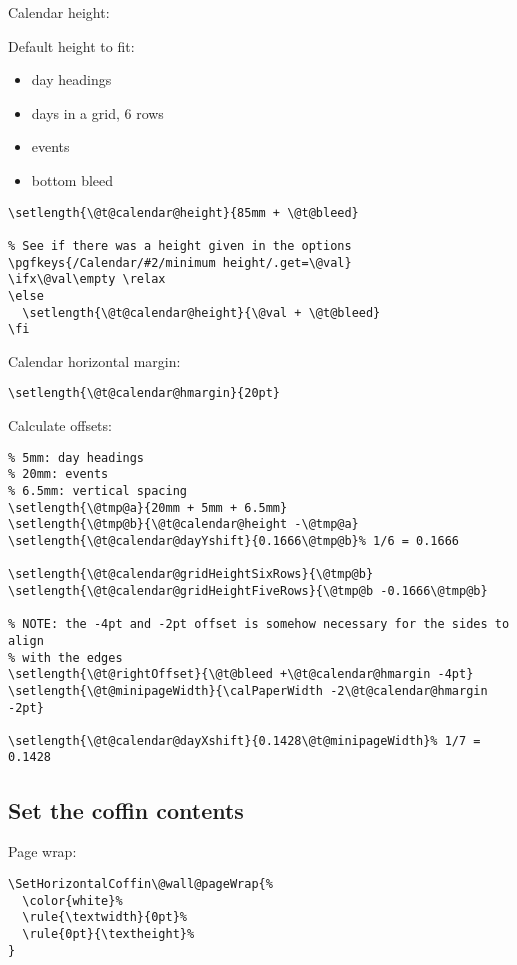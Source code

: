 \documentclass[11pt,oneside]{memoir-article}
\begin{document}
Calendar height:

Default height to fit:

\begin{itemize}
\item day headings
\item days in a grid, 6 rows
\item events
\item bottom bleed
\end{itemize}

\begin{verbatim}
\setlength{\@t@calendar@height}{85mm + \@t@bleed}

% See if there was a height given in the options
\pgfkeys{/Calendar/#2/minimum height/.get=\@val}
\ifx\@val\empty \relax
\else
  \setlength{\@t@calendar@height}{\@val + \@t@bleed}
\fi
\end{verbatim}

Calendar horizontal margin:

\begin{verbatim}
\setlength{\@t@calendar@hmargin}{20pt}
\end{verbatim}

Calculate offsets:

\begin{verbatim}
% 5mm: day headings
% 20mm: events
% 6.5mm: vertical spacing
\setlength{\@tmp@a}{20mm + 5mm + 6.5mm}
\setlength{\@tmp@b}{\@t@calendar@height -\@tmp@a}
\setlength{\@t@calendar@dayYshift}{0.1666\@tmp@b}% 1/6 = 0.1666

\setlength{\@t@calendar@gridHeightSixRows}{\@tmp@b}
\setlength{\@t@calendar@gridHeightFiveRows}{\@tmp@b -0.1666\@tmp@b}

% NOTE: the -4pt and -2pt offset is somehow necessary for the sides to align
% with the edges
\setlength{\@t@rightOffset}{\@t@bleed +\@t@calendar@hmargin -4pt}
\setlength{\@t@minipageWidth}{\calPaperWidth -2\@t@calendar@hmargin -2pt}

\setlength{\@t@calendar@dayXshift}{0.1428\@t@minipageWidth}% 1/7 = 0.1428
\end{verbatim}

\subsection{Set the coffin contents}
\label{sec:orgfa049f6}

Page wrap:

\begin{verbatim}
\SetHorizontalCoffin\@wall@pageWrap{%
  \color{white}%
  \rule{\textwidth}{0pt}%
  \rule{0pt}{\textheight}%
}
\end{verbatim}
\end{document}
